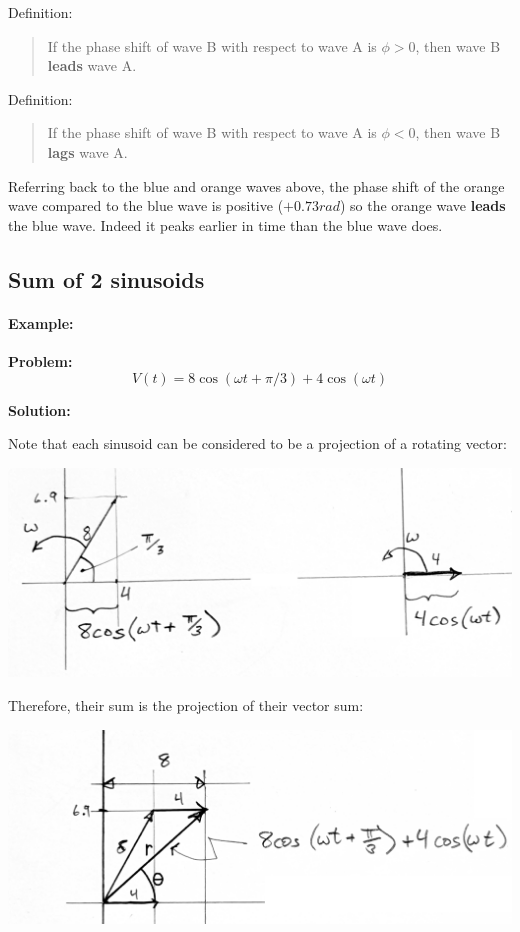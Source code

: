 Definition:

\begin{quotation}
If the phase shift of wave B with respect to wave A is $\phi>0$, then
wave B {\bf leads} wave A.
\end{quotation}


Definition:

\begin{quotation}
If the phase shift of wave B with respect to wave A is $\phi<0$, then
wave B {\bf lags} wave A.
\end{quotation}


Referring back to the blue and orange waves above, the phase shift of the orange
wave compared to the blue wave is positive ($+0.73rad$) so the orange wave {\bf leads} the
blue wave.  Indeed it  peaks earlier in time than the blue wave does.



\subsection{Sum of 2 sinusoids}
\paragraph{Example:}

{\bf Problem: }
\[
V(t) = 8\cos(\omega t + \pi/3) + 4\cos(\omega t)
\]

{\bf Solution: }

Note that each sinusoid can be considered to be a projection of a rotating vector:


\includegraphics[width=\textwidth]{figsChapt02/KG21706.png}

Therefore, their sum is the projection of their vector sum:

\includegraphics[width=.8\textwidth]{figsChapt02/NE94010.png}


